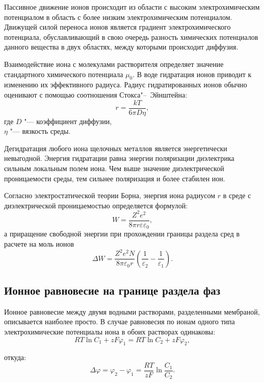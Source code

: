 \documentclass[12pt,a4paper,oneside]{book}
\begin{document}
Пассивное движение ионов происходит из области с высоким электрохимическим потенциалом в область с более низким электрохимическим потенциалом. Движущей силой переноса ионов является градиент электрохимического потенциала, обуславливающий в свою очередь разность химических потенциалов данного вещества в двух областях, между которыми происходит диффузия.

Взаимодействие иона с молекулами растворителя определяет значение стандартного химического потенциала $\mu_0$. В воде гидратация ионов приводит к изменению их эффективного радиуса. Радиус гидратированных ионов обычно оценивают с помощью соотношения Стокса"--~Эйнштейна:
\begin{equation}
	r = \frac{kT}{6\pi D\eta},
\end{equation}
где $D$ "--- коэффициент диффузии,\\
$\eta$ "--- вязкость среды.

Дегидратация любого иона щелочных металлов является энергетически невыгодной. Энергия гидратации равна энергии поляризации диэлектрика сильным локальным полем иона. Чем выше значение диэлектрической проницаемости среды, тем сильнее поляризация и более стабилен ион.

Согласно электростатической теории Борна, энергия иона радиусом $r$ в среде с диэлектрической проницаемостью определяется формулой:
\begin{equation}
	W = \frac{Z^2e^2}{8\pi r \varepsilon \varepsilon_0},
\end{equation}
а приращение свободной энергии при прохождении границы раздела сред в расчете на моль ионов 
\begin{equation}
	\Delta W = \frac{Z^2e^2N}{8\pi \varepsilon_0 r} \left( \frac{1}{\varepsilon_2} -
		\frac{1}{\varepsilon_1} \right).
\end{equation}

\subsection{Ионное равновесие на границе раздела фаз}

Ионное равновесие между двумя водными растворами, разделенными мембраной, описывается наиболее просто. В случае равновесия по ионам одного типа электрохимические потенциалы иона в обоих растворах одинаковы:
\begin{equation}
	RT \ln C_1 + zF \varphi_1 = RT \ln C_2+zF \varphi_2,
\end{equation}

откуда:
\begin{equation}
	\Delta \varphi = \varphi_2 - \varphi_1 = \frac{RT}{zF} \ln\frac{C_1}{C_2}.
\end{equation}
 
\end{document}
